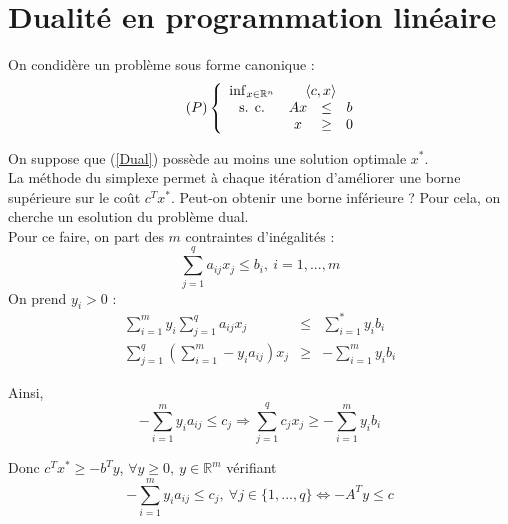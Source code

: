 \section{Dualité en programmation linéaire}
On condidère un problème sous forme canonique :
\begin{equation}\tag{$P$} \label{Dual}
	\left\{ \begin{array}{c c c c} \inf_{x\in\mathbb{R}^n} & \multicolumn{3}{c}{\langle c,x\rangle} \\
						\text{s. c.}     & Ax &\leq& b \\
								& x &\geq& 0
	\end{array} \right.
\end{equation}

On suppose que (\ref{Dual}) possède au moins une solution optimale $x^*$. \\
La méthode du simplexe permet à chaque itération d'améliorer une borne supérieure sur le coût $c^Tx^*$. Peut-on obtenir une borne inférieure ? Pour cela, on cherche un esolution du problème dual.\\
Pour ce faire, on part des $m$ contraintes d'inégalités :
	\[\sum_{j=1}^q a_{ij}x_j\leq b_i,\ i=1,...,m\]
On prend $y_i>0$ : 
\begin{eqnarray*}
	\sum_{i=1}^m y_i \sum_{j=1}^q a_{ij}x_j&\leq& \sum_{i=1}^* y_ib_i\\
	\sum_{j=1}^q \left( \sum_{i=1}^m -y_ia_{ij}\right) x_j&\geq& -\sum_{i=1}^m y_ib_i
\end{eqnarray*}

Ainsi, \[-\sum_{i=1}^m y_ia_{ij} \leq c_j \Rightarrow \sum_{j=1}^q c_jx_j \geq -\sum_{i=1}^m y_ib_i\]

Donc $c^Tx^*\geq -b^Ty$, $\forall y\geq 0,\ y\in\mathbb{R}^m$ vérifiant \[-\sum_{i=1}^m y_ia_{ij} \leq c_j,\ \forall j\in\{1,...,q\}\Leftrightarrow -A^Ty\leq c\]



